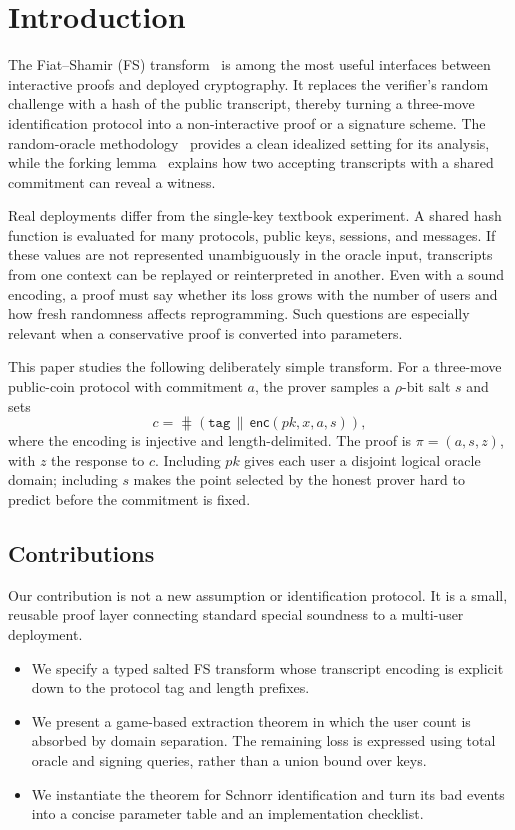 \section{Introduction}
\label{sec:introduction}

The Fiat--Shamir (FS) transform~\cite{FiatShamir1986} is among the most useful
interfaces between interactive proofs and deployed cryptography.  It replaces
the verifier's random challenge with a hash of the public transcript, thereby
turning a three-move identification protocol into a non-interactive proof or a
signature scheme.  The random-oracle methodology~\cite{BellareRogaway1993}
provides a clean idealized setting for its analysis, while the forking
lemma~\cite{PointchevalStern1996} explains how two accepting transcripts with a
shared commitment can reveal a witness.

Real deployments differ from the single-key textbook experiment.  A shared
hash function is evaluated for many protocols, public keys, sessions, and
messages.  If these values are not represented unambiguously in the oracle
input, transcripts from one context can be replayed or reinterpreted in
another.  Even with a sound encoding, a proof must say whether its loss grows
with the number of users and how fresh randomness affects reprogramming.  Such
questions are especially relevant when a conservative proof is converted into
parameters.

This paper studies the following deliberately simple transform.  For a
three-move public-coin protocol with commitment $a$, the prover samples a
$\rho$-bit salt $s$ and sets
\[
  c = \hash(\mathtt{tag}\,\|\,\mathsf{enc}(pk,x,a,s)),
\]
where the encoding is injective and length-delimited.  The proof is
$\pi=(a,s,z)$, with $z$ the response to $c$.  Including $pk$ gives each user a
disjoint logical oracle domain; including $s$ makes the point selected by the
honest prover hard to predict before the commitment is fixed.

\subsection{Contributions}

Our contribution is not a new assumption or identification protocol.  It is a
small, reusable proof layer connecting standard special soundness to a
multi-user deployment.

\begin{itemize}
  \item We specify a typed salted FS transform whose transcript encoding is
        explicit down to the protocol tag and length prefixes.
  \item We present a game-based extraction theorem in which the user count is
        absorbed by domain separation.  The remaining loss is expressed using
        total oracle and signing queries, rather than a union bound over keys.
  \item We instantiate the theorem for Schnorr identification and turn its bad
        events into a concise parameter table and an implementation checklist.
\end{itemize}

